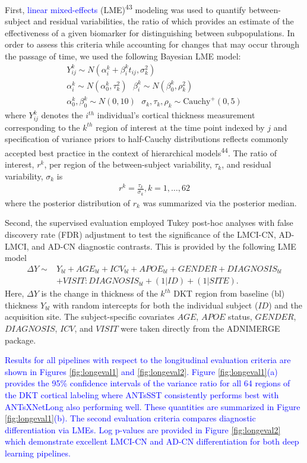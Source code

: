 \documentclass[12pt,]{article}
\begin{document}
First, \textcolor{blue}{linear mixed-effects} (LME)\textsuperscript{43}
modeling was used to quantify between-subject and residual
variabilities, the ratio of which provides an estimate of the
effectiveness of a given biomarker for distinguishing between
subpopulations. In order to assess this criteria while accounting for
changes that may occur through the passage of time, we used the
following Bayesian LME model: \begin{gather}
  Y^k_{ij} \sim N(\alpha^k_i + \beta^k_i t_{ij}, \sigma_k^2) \\ \nonumber
  \alpha^k_i \sim N(\alpha^k_0, \tau^2_k) \,\,\,\, \beta^k_i \sim N(\beta^k_0, \rho^2_k) \\ \nonumber
  \alpha^k_0, \beta^k_0 \sim N(0,10) \,\,\,\,  \sigma_k, \tau_k, \rho_k \sim \mbox{Cauchy}^+ (0, 5)
\end{gather} where \(Y^k_{ij}\) denotes the \(i^{th}\) individual's
cortical thickness measurement corresponding to the \(k^{th}\) region of
interest at the time point indexed by \(j\) and specification of
variance priors to half-Cauchy distributions reflects commonly accepted
best practice in the context of hierarchical models\textsuperscript{44}.
The ratio of interest, \(r^k\), per region of the between-subject
variability, \(\tau_k\), and residual variability, \(\sigma_k\) is
\begin{align}
  r^k = \frac{\tau_k}{\sigma_k}, k = 1,\ldots,62
\end{align} where the posterior distribution of \(r_k\) was summarized
via the posterior median.

Second, the supervised evaluation employed Tukey post-hoc analyses with
false discovery rate (FDR) adjustment to test the significance of the
LMCI-CN, AD-LMCI, and AD-CN diagnostic contrasts. This is provided by
the following LME model \begin{align}
  \Delta Y \sim & Y_{bl} + AGE_{bl} + ICV_{bl} + APOE_{bl} + GENDER + DIAGNOSIS_{bl} \\ \nonumber
                & + VISIT:DIAGNOSIS_{bl} + (1 | ID) + (1 | SITE).
\end{align} Here, \(\Delta Y\) is the change in thickness of the
\(k^{th}\) DKT region from baseline (bl) thickness \(Y_{bl}\) with
random intercepts for both the individual subject (\(ID\)) and the
acquisition site. The subject-specific covariates \(AGE\), \(APOE\)
status, \(GENDER\), \(DIAGNOSIS\), \(ICV\), and \(VISIT\) were taken
directly from the ADNIMERGE package.

\textcolor{blue}{Results for all pipelines with respect to the longitudinal
evaluation criteria are shown in Figures \ref{fig:longeval1} and
\ref{fig:longeval2}.  Figure \ref{fig:longeval1}(a) provides the 95\% confidence
intervals of the variance ratio for all 64 regions of the DKT cortical labeling
where ANTsSST consistently performs best with ANTsXNetLong also performing
well.  These quantities are summarized in Figure \ref{fig:longeval1}(b).  The
second evaluation criteria compares diagnostic differentiation via LMEs.  Log
p-values are provided in Figure \ref{fig:longeval2} which demonstrate excellent
LMCI-CN and AD-CN differentiation for both deep learning pipelines.}
\end{document}
